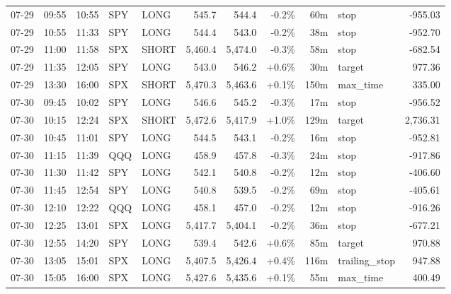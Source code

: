 \documentclass[11pt,a4paper,twoside]{article}
\begin{document}
\begin{center}
\begin{longtable}{>{\color{txtmain}}l l l l l r r r r >{\color{txtmain}}l r}
07-29 & 09:55 & 10:55 & SPY & LONG & 545.7 & 544.4 & \textcolor{lossred}{-0.2\%} & 60m & stop & \textcolor{lossred}{-955.03} \\
07-29 & 10:55 & 11:33 & SPY & LONG & 544.4 & 543.0 & \textcolor{lossred}{-0.2\%} & 38m & stop & \textcolor{lossred}{-952.70} \\
07-29 & 11:00 & 11:58 & SPX & SHORT & 5,460.4 & 5,474.0 & \textcolor{lossred}{-0.3\%} & 58m & stop & \textcolor{lossred}{-682.54} \\
07-29 & 11:35 & 12:05 & SPY & LONG & 543.0 & 546.2 & \textcolor{wingreen}{+0.6\%} & 30m & target & \textcolor{wingreen}{977.36} \\
07-29 & 13:30 & 16:00 & SPX & SHORT & 5,470.3 & 5,463.6 & \textcolor{wingreen}{+0.1\%} & 150m & max\_time & \textcolor{wingreen}{335.00} \\
07-30 & 09:45 & 10:02 & SPY & LONG & 546.6 & 545.2 & \textcolor{lossred}{-0.3\%} & 17m & stop & \textcolor{lossred}{-956.52} \\
07-30 & 10:15 & 12:24 & SPX & SHORT & 5,472.6 & 5,417.9 & \textcolor{wingreen}{+1.0\%} & 129m & target & \textcolor{wingreen}{2,736.31} \\
07-30 & 10:45 & 11:01 & SPY & LONG & 544.5 & 543.1 & \textcolor{lossred}{-0.2\%} & 16m & stop & \textcolor{lossred}{-952.81} \\
07-30 & 11:15 & 11:39 & QQQ & LONG & 458.9 & 457.8 & \textcolor{lossred}{-0.3\%} & 24m & stop & \textcolor{lossred}{-917.86} \\
07-30 & 11:30 & 11:42 & SPY & LONG & 542.1 & 540.8 & \textcolor{lossred}{-0.2\%} & 12m & stop & \textcolor{lossred}{-406.60} \\
07-30 & 11:45 & 12:54 & SPY & LONG & 540.8 & 539.5 & \textcolor{lossred}{-0.2\%} & 69m & stop & \textcolor{lossred}{-405.61} \\
07-30 & 12:10 & 12:22 & QQQ & LONG & 458.1 & 457.0 & \textcolor{lossred}{-0.2\%} & 12m & stop & \textcolor{lossred}{-916.26} \\
07-30 & 12:25 & 13:01 & SPX & LONG & 5,417.7 & 5,404.1 & \textcolor{lossred}{-0.2\%} & 36m & stop & \textcolor{lossred}{-677.21} \\
07-30 & 12:55 & 14:20 & SPY & LONG & 539.4 & 542.6 & \textcolor{wingreen}{+0.6\%} & 85m & target & \textcolor{wingreen}{970.88} \\
07-30 & 13:05 & 15:01 & SPX & LONG & 5,407.5 & 5,426.4 & \textcolor{wingreen}{+0.4\%} & 116m & trailing\_stop & \textcolor{wingreen}{947.88} \\
07-30 & 15:05 & 16:00 & SPX & LONG & 5,427.6 & 5,435.6 & \textcolor{wingreen}{+0.1\%} & 55m & max\_time & \textcolor{wingreen}{400.49} \\

\end{longtable}
\end{center}
\end{document}

